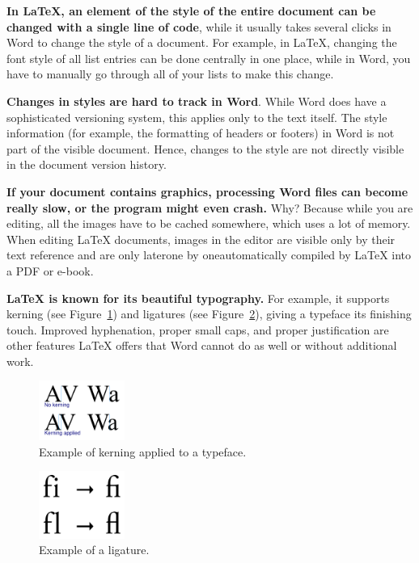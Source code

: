 \textbf{In LaTeX, an element of the style of the entire document can be changed with a single line of code}, while it usually takes several clicks in Word to change the style of a document. For example, in LaTeX, changing the font style of all list entries can be done centrally in one place, while in Word, you have to manually go through all of your lists to make this change.

\textbf{Changes in styles are hard to track in Word}. While Word does have a sophisticated versioning system, this applies only to the text itself. The style information (for example, the formatting of headers or footers) in Word is not part of the visible document. Hence, changes to the style are not directly visible in the document version history.



\textbf{If your document contains graphics, processing Word files can become really slow, or the program might even crash.} Why? Because while you are editing, all the images have to be cached somewhere, which uses a lot of memory. When editing LaTeX documents, images in the editor are visible only by their text reference and are only later\emdash{}one by one\emdash{}automatically compiled by LaTeX into a PDF or e-book.

\textbf{LaTeX is known for its beautiful typography.} For example, it supports kerning (see Figure~\ref{kerning:fig}) and ligatures (see Figure~\ref{ligatures:fig}), giving a typeface its finishing touch. Improved hyphenation, proper small caps, and proper justification are other features LaTeX offers that Word cannot do as well or without additional work.

\begin{figure}[H]\centering
\includegraphics[width=0.25\textwidth]{images/1920px-Kerning-EN.png}
\caption{Example of kerning applied to a typeface.}
\label{kerning:fig}
\end{figure}

\begin{figure}[H]\centering
\includegraphics[width=0.25\textwidth]{images/Ligature-drawing.png}
\caption{Example of a ligature.}
\label{ligatures:fig}
\end{figure}


